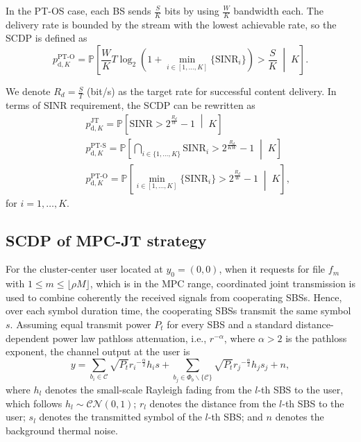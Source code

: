 \documentclass[twocolumns,10pt]{IEEEtran}
\begin{document}
In the PT-OS case, each BS sends $\frac{S}{K}$ bits by using $\frac{W}{K}$ bandwidth each. The delivery rate is bounded by the stream with the lowest achievable rate, so the SCDP is defined as
\begin{equation}
p_{\text{d},K}^{\text{PT-O}}=\mathbb{P}\left[\frac{W}{K} T\log_2(1+\min\limits_{i\in[1,\ldots, K]}\{\text{SINR}_i\})> \frac{S}{K} \;\middle|\; K \right].
\end{equation}

We denote $R_d=\frac{S}{T}$ (bit/s) as the target rate for successful content delivery. In terms of SINR requirement, the SCDP can be rewritten as 
\begin{eqnarray}
&& p_{\text{d},K}^{\text{JT}}=\mathbb{P}\left[\text{SINR}> 2^{\frac{R_d}{W}}-1 \;\middle|\; K\right] \label{def_scdp_jt}\\
&& p_{\text{d},K}^{\text{PT-S}}=\mathbb{P}\left[\bigcap\limits_{i\in \{1,\ldots, K\}}\text{SINR}_i> 2^{\frac{R_d}{KW}}-1\;\middle|\; K\right]  \label{def_scdp_ptss} \\
&& p_{\text{d},K}^{\text{PT-O}}=\mathbb{P}\left[\min\limits_{i\in[1,\ldots, K]}\{\text{SINR}_i\}> 2^{\frac{R_d}{W}}-1\;\middle|\; K\right ],  \label{def_scdp_ptos}
\end{eqnarray}
for $i=1,\ldots, K$.




\subsection{SCDP of MPC-JT strategy} 
\label{JT}
For the cluster-center user located at $y_0=\left(0, 0\right) $, when it requests for file $f_m$ with $1\leq m\leq \lfloor\rho M \rfloor$, which is in the MPC range, coordinated joint transmission is used to combine coherently the received signals from cooperating SBSs. Hence, over each symbol duration time, the cooperating SBSs transmit the same symbol $s$. Assuming equal transmit power $P_t$ for every SBS and a standard distance-dependent power law pathloss attenuation, i.e., $r^{-\alpha}$, where $\alpha>2$ is the pathloss exponent, the channel output at the user is
\begin{equation}
y=\sum_{b_i\in \mathcal{C}} \sqrt{P_t} {r_i}^{-\frac{\alpha}{2}} h_i s +\sum_{b_j\in \Phi_b \backslash \{\mathcal{C}\} } \sqrt{P_t} {r_j}^{-\frac{\alpha}{2}} h_j s_j+n,
\end{equation} 
where $h_l$ denotes the small-scale Rayleigh fading from the $l$-th SBS to the user, which follows $h_l \sim \mathcal{CN}(0, 1)$; $r_l$ denotes the distance from the $l$-th SBS to the user; $s_l$ denotes the transmitted symbol of the $l$-th SBS; and $n$ denotes the background thermal noise.
\end{document}
